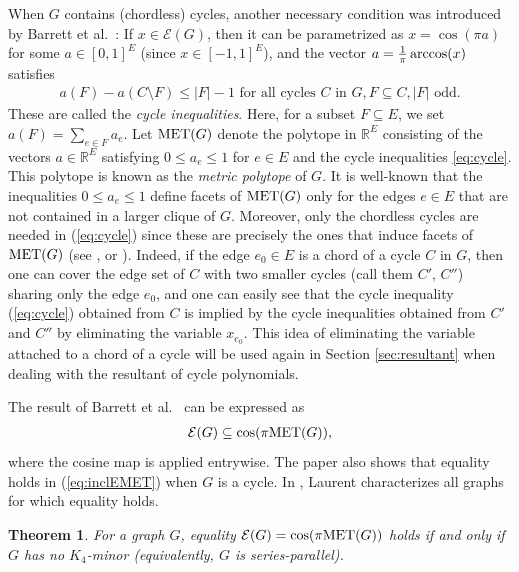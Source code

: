 \documentclass[a4paper, 11pt, twoside]{article}
\newcommand{\R}{\mathbb{R}}
\newcommand{\ME}{{\mathcal E}}
\newcommand{\MET}{\text{\rm MET}}
\theoremstyle{plain}
\newtheorem{theorem}{Theorem}[section]
\begin{document}
 When $G$ contains  (chordless) cycles,  
another necessary condition
was introduced by Barrett et al.~\cite{Barrett1993realpositivedefinite}: If $x\in \ME(G)$, then it can be parametrized as $x=\cos (\pi a)$ for some $a\in [0,1]^E$ (since $x\in [-1,1]^E$), and the vector $a={1\over \pi} \arccos(x)$ satisfies 
\begin{align}\label{eq:cycle}
a(F)-a(C\setminus F)\le |F|-1 \text{ for all cycles } C \text{ in } G, F\subseteq C, |F| \text{ odd}.
\end{align}
These are called the \emph{cycle inequalities}. 
Here, for a subset $F\subseteq E$, we set $a(F)=\sum_{e\in F}a_e$.
Let $\MET(G)$ denote the polytope in $\R^E$ consisting of the vectors $a\in \R^E$ satisfying  $0\le a_e\le 1$ for $e\in E$ and the cycle inequalities \eqref{eq:cycle}. This polytope is known as the {\em metric polytope} of $G$. 
It is well-known that the inequalities $0\le a_e\le 1$ define facets of $\MET(G)$ only for the edges $e\in E$ that are not contained in a larger clique of $G$. Moreover,  only the chordless cycles are needed in (\ref{eq:cycle}) since these are precisely the ones that induce facets of $\MET(G)$ (see \cite{Barahona-Mahjoub}, or  \cite[Chap. 27]{Deza-Laurent-1997}).  Indeed, if the edge $e_0\in E$ is a chord of a cycle $C$ in $G$, then one can cover the edge set of $C$ with two smaller cycles (call them $C'$, $C''$) sharing only the edge $e_0$, and one can easily see that the cycle inequality (\ref{eq:cycle}) obtained from $C$ is implied by the cycle inequalities obtained from $C'$ and $C''$ by eliminating the variable $x_{e_0}$. 
This idea of eliminating the variable attached to a chord of a cycle will be used again in Section \ref{sec:resultant} 
when dealing with the resultant of cycle polynomials. 

The result of Barrett et al.~\cite{Barrett1993realpositivedefinite} can be expressed as
\begin{align}\label{eq:inclEMET}
\ME(G)\subseteq \cos(\pi \MET(G)),
\end{align}
where the cosine map is applied entrywise. 
The paper \cite{Barrett1993realpositivedefinite} also shows that equality holds in (\ref{eq:inclEMET}) when $G$ is a cycle. In \cite{Laurent1997realpositivesemidefinite}, Laurent characterizes all graphs for which equality holds.
 
\begin{theorem} \label{thm:cosineMETnoK4minors} \cite{Laurent1997realpositivesemidefinite}
For a graph $G$, equality $\ME(G)=\cos(\pi\MET(G))$ holds if and only if $G$ has no $K_4$-minor (equivalently, $G$ is series-parallel).
\end{theorem}
\end{document}
